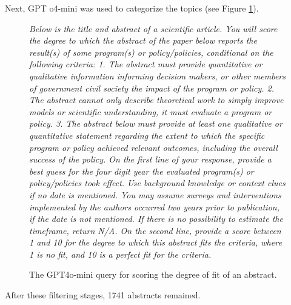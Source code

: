 \documentclass[12pt,a4paper]{article}
\begin{document}
Next, GPT o4-mini was used to categorize the topics (see Figure \ref{fig:scoringfigure}).
\begin{figure}[htbp]
  \centering
  \begin{tcolorbox}[left=4pt, right=4pt, top=4pt, bottom=4pt]
\ttfamily\footnotesize

\emph{
Below is the title and abstract of a scientific article. 
You will score the degree to which the abstract of the paper below reports the result(s) of some program(s) or policy/policies, conditional on the following criteria: 
 1. The abstract must provide quantitative or qualitative information informing decision makers, or other members of government civil society the impact of the program or policy. 
 2. The abstract cannot only describe theoretical work to simply improve models or scientific understanding, it must evaluate a program or policy. 
 3. The abstract below must provide at least one qualitative or quantitative statement regarding the extent to which the specific program or policy achieved relevant outcomes, including the overall success of the policy.  
On the first line of your response, provide a best guess for the four digit year the evaluated program(s) or policy/policies took effect. Use background knowledge or context clues if no date is mentioned. You may assume surveys and interventions implemented by the authors occurred two years prior to publication, if the date is not mentioned. If there is no possibility to estimate the timeframe, return N/A.
On the second line, provide a score between 1 and 10 for the degree to which this abstract fits the criteria, where 1 is no fit, and 10 is a perfect fit for the criteria.}
  \end{tcolorbox}
  \caption{The GPT4o-mini query for scoring the degree of fit of an abstract.}
  \label{fig:scoringfigure}
\end{figure}


After these filtering stages, 1741 abstracts remained.
\end{document}
